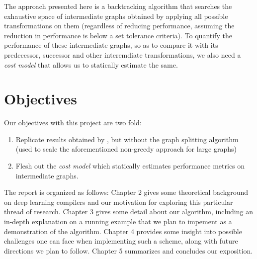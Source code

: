 \documentclass[12pt,a4paper,twoside,openright,bibliography=totocnumbered]{report}
\begin{document}
The approach presented here is a backtracking algorithm that searches the exhaustive space of intermediate graphs obtained by applying all possible transformations on them (regardless of reducing performance, assuming the reduction in performance is below a set tolerance criteria). To quantify the performance of these intermediate graphs, so as to compare it with its predecessor, successor and other interemdiate transformations, we also need a \textit{cost model} that allows us to statically estimate the same.

\section{Objectives}
Our objectives with this project are two fold:
\begin{enumerate}
	\item Replicate results obtained by \cite{jia2019}, but without the graph splitting algorithm (used to scale the aforementioned non-greedy approach for large graphs)
	\item Flesh out the \textit{cost model} which statically estimates performance metrics on intermediate graphs.
\end{enumerate}
	
\noindent The report is organized as follows:
Chapter 2 gives some theoretical background on deep learning compilers and our motivation for exploring this particular thread of research. Chapter 3 gives some detail about our algorithm, including an in-depth explanation on a running example that we plan to impement as a demonstration of the algorithm. Chapter 4 provides some insight into possible challenges one can face when implementing such a scheme, along with future directions we plan to follow. Chapter 5 summarizes and concludes our exposition.


\end{document}
